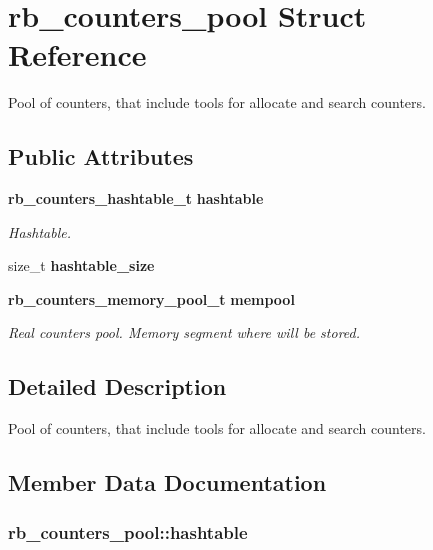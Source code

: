 \section{rb\+\_\+counters\+\_\+pool Struct Reference}
\label{structrb__counters__pool}


Pool of counters, that include tools for allocate and search counters.  


\subsection*{Public Attributes}
\begin{DoxyCompactItemize}
\item 
{\bf rb\+\_\+counters\+\_\+hashtable\+\_\+t} {\bf hashtable}
\begin{DoxyCompactList}\small\item\em Hashtable. \end{DoxyCompactList}\item 
size\+\_\+t {\bf hashtable\+\_\+size}
\item 
{\bf rb\+\_\+counters\+\_\+memory\+\_\+pool\+\_\+t} {\bf mempool}
\begin{DoxyCompactList}\small\item\em Real counters pool. Memory segment where will be stored. \end{DoxyCompactList}\end{DoxyCompactItemize}


\subsection{Detailed Description}
Pool of counters, that include tools for allocate and search counters. 

\subsection{Member Data Documentation}
\subsubsection[{hashtable}]{ rb\+\_\+counters\+\_\+pool\+::hashtable}\label{structrb__counters__pool_adf9ebd540d7dfff78c737ea2347a39ed}


